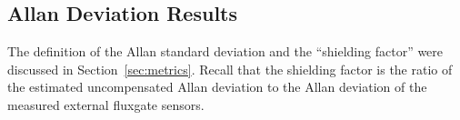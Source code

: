 
\subsection{Allan Deviation Results}\label{sec:adev_res}

The definition of the Allan standard deviation and the ``shielding
factor'' were discussed in Section~\ref{sec:metrics}.  Recall that the
shielding factor is the ratio of the estimated uncompensated Allan
deviation to the Allan deviation of the measured external fluxgate
sensors.





